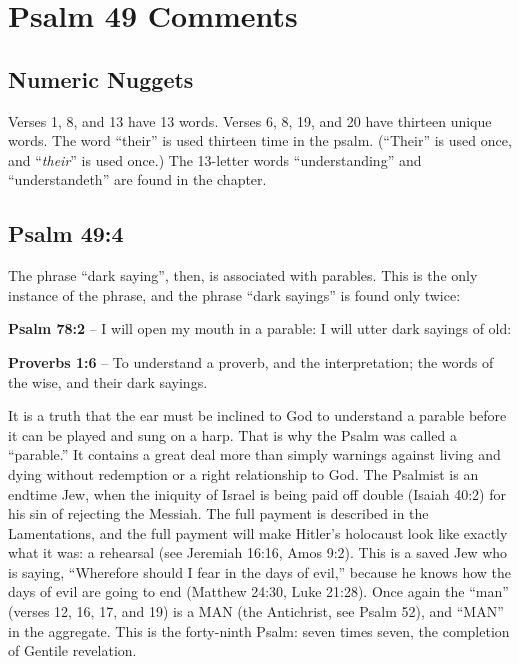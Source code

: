 \section{Psalm 49 Comments}

\subsection{Numeric Nuggets}
Verses 1, 8, and 13 have 13 words. Verses 6,  8, 19, and 20 have thirteen unique words. The word ``their'' is used thirteen time in the psalm. (``Their'' is used once, and ``\emph{their}'' is used once.) The 13-letter words ``understanding'' and ``understandeth'' are found in the chapter.

\subsection{Psalm 49:4}
The phrase ``dark saying'', then, is associated with parables. This is the only instance of the phrase, and the phrase ``dark sayings'' is found only twice: \begin{compactenum}
\item \textbf{Psalm 78:2} -- I will open my mouth in a parable: I will utter dark sayings of old: 
\item \textbf{Proverbs 1:6} -- To understand a proverb, and the interpretation; the words of the wise, and their dark sayings.
\end{compactenum}
It is a truth that the ear must be inclined to God to understand a parable before it can be played and sung on a harp. That is why the Psalm was called a ``parable.'' It contains a great deal more than simply warnings against living and dying without redemption or a right relationship to God. The Psalmist is an endtime Jew, when the iniquity of Israel is being paid off double (Isaiah 40:2) for his sin of rejecting the Messiah. The full payment is described in the Lamentations, and the full payment will make Hitler’s holocaust look like exactly what it was: a rehearsal (see Jeremiah 16:16, Amos 9:2). This is a saved Jew who is saying, “Wherefore should I fear in the days of evil,” because he knows how the days of evil are going to end (Matthew 24:30, Luke 21:28). Once again the “man” (verses 12, 16, 17, and 19) is a MAN (the Antichrist, see Psalm 52), and “MAN” in the aggregate. This is the forty-ninth Psalm: seven times seven, the completion of Gentile revelation.\cite{Ruckman1992Psalms}

